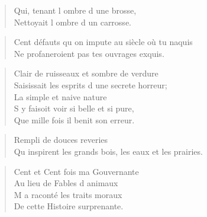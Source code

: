 \begin{verse}
Qui, tenant l\textquotesingle{} ombre d\textquotesingle{} une brosse, \\
Nettoyait l\textquotesingle{} ombre d\textquotesingle{} un carrosse.
\end{verse}

\begin{verse}
\textquotesingle{} Cent défauts qu\textquotesingle{} on impute au siècle où tu naquis \\
Ne profaneroient pas tes ouvrages exquis.\textquotesingle{} 
\end{verse}

\begin{verse}
\textquotesingle{} Clair de ruisseaux et sombre de verdure \\
Saisissait les esprits d\textquotesingle{} une secrete horreur; \\
\vin La simple et naive nature \\
\vin S\textquotesingle{} y faisoit voir si belle et si pure, \\
\vin Que mille fois il benit son erreur.\textquotesingle{} 
\end{verse}

\begin{verse}
\vin \textquotesingle{} Rempli de douces reveries \\
Qu\textquotesingle{} inspirent les grands bois, les eaux et les prairies.\textquotesingle{} 
\end{verse}

\begin{verse}
\textquotesingle{} Cent et Cent fois ma Gouvernante \\
\vin Au lieu de Fables d\textquotesingle{} animaux \\
\vin M\textquotesingle{} a raconté les traits moraux \\
De cette Histoire surprenante.\textquotesingle{} 
\end{verse}

